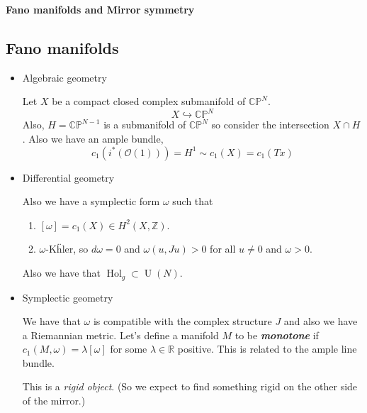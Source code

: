 \documentclass{article}
\numberwithin{equation}{section}
\newcommand{\R}{\mathbb{R}}
\newcommand{\Z}{\mathbb{Z}}
\newcommand{\C}{\mathbb{C}}
\renewcommand{\P}{\mathbb{P}}
\newcommand{\Oc}{\mathcal{O}}
\DeclareMathOperator{\U}{U}
\DeclareMathOperator{\Hol}{Hol}
\begin{document}
	{\Large\bfseries Fano manifolds and Mirror symmetry }
	
	
	\subsection*{Fano manifolds}
	\begin{itemize}
		\item Algebraic geometry
		
		Let $X$ be a compact closed complex submanifold of $\C\P^N$.
		\[X\hookrightarrow \C\P^N\]
		Also, $H=\C\P^{N-1}$ is a submanifold of $\C\P^N$ so consider the intersection $X\cap H$. Also we have an ample bundle,
		\[c_1(i^*(\Oc(1)))=H^1\sim c_1(X)=c_1(Tx)\]
		
		\item Differential geometry
		
		Also we have a symplectic form $\omega$ such that
		\begin{enumerate}
			\item $[\omega]=c_1(X)\in H^2(X,\Z)$.
			\item $\omega$-K\"hler, so $d\omega=0$ and $\omega(u,Ju)>0$ for all $u\neq 0$ and $\omega>0$.
		\end{enumerate}
		Also we have that $\Hol_g\subset \U(N)$.
		
		\item Symplectic geometry
		
		We have that $\omega$ is compatible with the complex structure $J$ and also we have a Riemannian metric. Let's define a manifold $M$ to be \textbf{\textit{monotone}} if $c_1(M,\omega)=\lambda[\omega]$ for some $\lambda\in\R$ positive. This is related to the ample line bundle.
		
		This is a \textit{rigid object}. (So we expect to find something rigid on the other side of the mirror.)
	\end{itemize}
\end{document}
